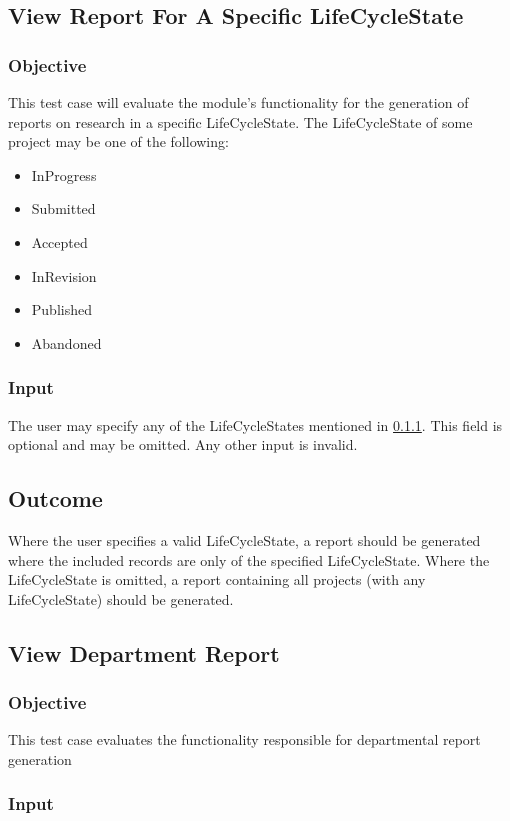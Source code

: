 \subsection{View Report For A Specific LifeCycleState}
\subsubsection{Objective} \label{TC_LifeCycleState_Obj}
This test case will evaluate the module's functionality for the generation of reports on research in a specific LifeCycleState. The LifeCycleState of some project may be one of the following:
\begin{itemize}
	\item InProgress
	\item Submitted
	\item Accepted
	\item InRevision
	\item Published
	\item Abandoned
\end{itemize}

\subsubsection{Input}
The user may specify any of the LifeCycleStates mentioned in \ref{TC_LifeCycleState_Obj}. 
This field is optional and may be omitted. Any other input is invalid.

\subsection{Outcome}
Where the user specifies a valid LifeCycleState, a report should be generated where the included records are only of the specified LifeCycleState. 
Where the LifeCycleState is omitted, a report containing all projects (with any LifeCycleState) should be generated.

\subsection{View Department Report}
\subsubsection{Objective}
This test case evaluates the functionality responsible for departmental report generation

\subsubsection{Input}
